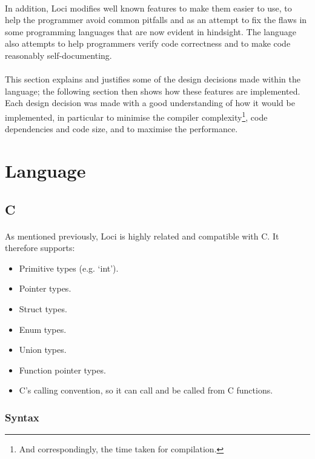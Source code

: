 \documentclass[12pt,twoside,notitlepage]{report}
\begin{document}
\paragraph{}
In addition, Loci modifies well known features to make them easier to use, to help the programmer avoid common pitfalls and as an attempt to fix the flaws in some programming languages that are now evident in hindsight. The language also attempts to help programmers verify code correctness and to make code reasonably self-documenting.

\paragraph{}
This section explains and justifies some of the design decisions made within the language; the following section then shows how these features are implemented. Each design decision was made with a good understanding of how it would be implemented, in particular to minimise the compiler complexity\footnote{And correspondingly, the time taken for compilation.}, code dependencies and code size, and to maximise the performance.

\section{Language}

\subsection{C}

\paragraph{}
As mentioned previously, Loci is highly related and compatible with C. It therefore supports:

\begin{itemize}
\item Primitive types (e.g. `int').
\item Pointer types.
\item Struct types.
\item Enum types.
\item Union types.
\item Function pointer types.
\item C's calling convention, so it can call and be called from C functions.
\end{itemize}

\subsubsection{Syntax}
\end{document}
